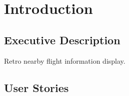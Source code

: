 \clearpage
\section{Introduction}
\subsection{Executive Description}

Retro nearby flight information display.

\subsection{User Stories}

